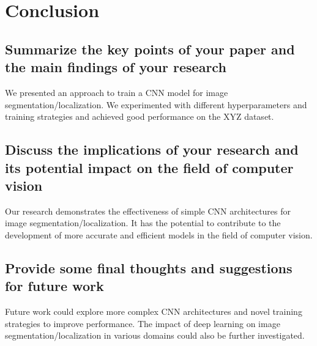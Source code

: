 


\chapter{Conclusion}

    \section{Summarize the key points of your paper and the main findings of your research}

        We presented an approach to train a CNN model for image segmentation/localization.
        We experimented with different hyperparameters and training strategies and achieved good performance on the XYZ dataset.

    \section{Discuss the implications of your research and its potential impact on the field of computer vision}

        Our research demonstrates the effectiveness of simple CNN architectures for image segmentation/localization.
        It has the potential to contribute to the development of more accurate and efficient models in the field of computer vision.

    \section{Provide some final thoughts and suggestions for future work}

        Future work could explore more complex CNN architectures and novel training strategies to improve performance.
        The impact of deep learning on image segmentation/localization in various domains could also be further investigated.
